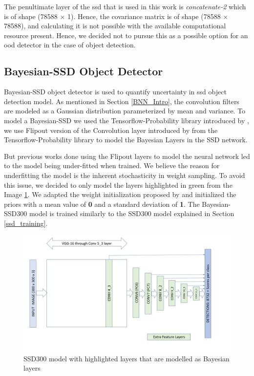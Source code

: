     The penultimate layer of the \acrshort{ssd} that is used in this work is \textit{concatenate-2} which is of shape (78588 $\times$ 1). Hence, the covariance matrix is of shape (78588 $\times$ 78588), and calculating it is not possible with the available computational resource present. Hence, we decided not to pursue this as a possible option for an \acrshort{ood} detector in the case of object detection.

    \subsection{Bayesian-SSD Object Detector}
    \label{Bayes-SSD}
    Bayesian-SSD object detector is used to quantify uncertainty in \acrshort{ssd} object detection model. As mentioned in Section \ref{BNN_Intro}, the convolution filters are modeled as a Gaussian distribution parameterized by mean and variance. To model a Bayesian-SSD we used the Tensorflow-Probability library introduced by \citet{Dillon2017}, we use Flipout version of the Convolution layer introduced by  \citet{Wen2018} from the Tensorflow-Probability library to model the Bayesian Layers in the SSD network.
    
    But previous works \cite{Krishnan2020, LaBonte2019} done using the Flipout layers to model the neural network led to the model being under-fitted when trained. We believe the reason for underfitting the model is the inherent stochasticity in weight sampling. To avoid this issue, we decided to only model the layers highlighted in green from the Image \ref{fig:BayesianSSD300}. We adapted the weight initialization proposed by \citet{xavier2010} and initialized the priors with a mean value of \textbf{0} and a standard deviation of \textbf{1}. The Bayesian-SSD300 model is trained similarly to the SSD300 model explained in Section \ref{ssd_training}. 
    
    \begin{figure}
        \centering
        \includegraphics[scale=0.35]{images/frameworks/SSD300_flipout.jpg}
        \caption[SSD object detection model with VGG-19 backbone]{SSD300 model with highlighted layers that are modelled as Bayesian layers}
        \label{fig:BayesianSSD300}
    \end{figure}
    
